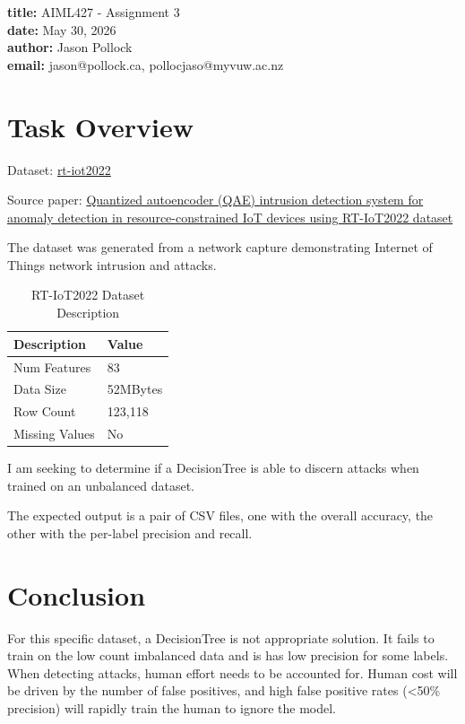 \documentclass[11pt]{article}
\begin{document}
	
	\noindent
	\textbf{title:} AIML427 - Assignment 3 \\
	\textbf{date:} May 30, 2026 \\
	\textbf{author:} Jason Pollock \\
	\textbf{email:} jason@pollock.ca, pollocjaso@myvuw.ac.nz
	
\section{Task Overview}

Dataset: \href{https://www.kaggle.com/datasets/supplejade/rt-iot2022real-time-internet-of-things/data}{rt-iot2022}


Source paper:
\href{https://link.springer.com/article/10.1186/s42400-023-00178-5}{Quantized autoencoder (QAE) intrusion detection system for anomaly detection in resource-constrained IoT devices using RT-IoT2022 dataset}

The dataset was generated from a network capture demonstrating Internet of Things network intrusion and attacks.

\begin{table}[H]
	\centering
	\begin{tabular}{ | l | l | }
		\hline
		\textbf{Description} & \textbf{Value} \\
		\hline
		Num Features & 83 \\
		\hline
		Data Size & 52MBytes \\
		\hline
		Row Count & 123,118 \\
		\hline
		Missing Values & No \\
		\hline
	\end{tabular}
	\caption{RT-IoT2022 Dataset Description}
\end{table}

I am seeking to determine if a DecisionTree is able to discern attacks when trained on an unbalanced dataset.

The expected output is a pair of CSV files, one with the overall accuracy, the other with the per-label precision and recall.

\section{Conclusion}

For this specific dataset, a DecisionTree is not appropriate solution. It fails to train on the low count imbalanced data and is has low precision for some labels. When detecting attacks, human effort needs to be accounted for. Human cost will be driven by the number of false positives, and high false positive rates (\textless 50\% precision) will rapidly train the human to ignore the model.
\end{document}
